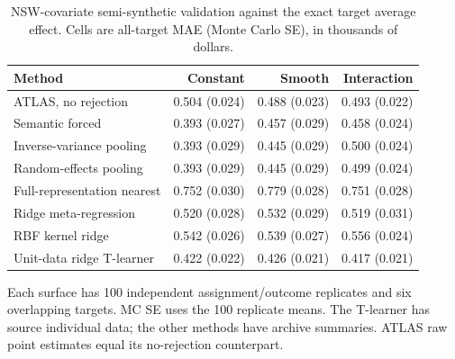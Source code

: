 \begin{table}[htbp]
\centering\small
\setlength{\tabcolsep}{4pt}
\caption{NSW-covariate semi-synthetic validation against the exact target average effect. Cells are all-target MAE (Monte Carlo SE), in thousands of dollars.}
\label{tab:ext-semi}
\begin{tabular}{lrrr}
\toprule
Method & Constant & Smooth & Interaction \\
\midrule
ATLAS, no rejection & 0.504 (0.024) & 0.488 (0.023) & 0.493 (0.022) \\
Semantic forced & 0.393 (0.027) & 0.457 (0.029) & 0.458 (0.024) \\
Inverse-variance pooling & 0.393 (0.029) & 0.445 (0.029) & 0.500 (0.024) \\
Random-effects pooling & 0.393 (0.029) & 0.445 (0.029) & 0.499 (0.024) \\
Full-representation nearest & 0.752 (0.030) & 0.779 (0.028) & 0.751 (0.028) \\
Ridge meta-regression & 0.520 (0.028) & 0.532 (0.029) & 0.519 (0.031) \\
RBF kernel ridge & 0.542 (0.026) & 0.539 (0.027) & 0.556 (0.024) \\
Unit-data ridge T-learner & 0.422 (0.022) & 0.426 (0.021) & 0.417 (0.021) \\
\bottomrule
\end{tabular}
\par\smallskip\begin{minipage}{0.97\linewidth}\footnotesize Each surface has 100 independent assignment/outcome replicates and six overlapping targets. MC SE uses the 100 replicate means. The T-learner has source individual data; the other methods have archive summaries. ATLAS raw point estimates equal its no-rejection counterpart.\end{minipage}
\end{table}
